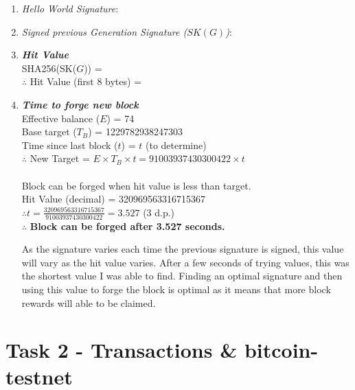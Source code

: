 \documentclass[11pt]{article}
\begin{document}
\begin{enumerate}
\item \textit{Hello World Signature}: \texttt{}

\item \textit{Signed previous Generation Signature ($SK(G)$)}: \texttt{}

\item \textbf{\textit{Hit Value}}\\
SHA256(SK($G$)) = \texttt{}\\
$\therefore$ Hit Value (first 8 bytes) = \textbf{\texttt{}}

\item \textbf{\textit{Time to forge new block}}\\
Effective balance ($E$) = 74\\
Base target ($T_B$) = 1229782938247303\\
Time since last block ($t$) = $t$ (to determine)\\
$\therefore$ New Target = $E\times T_B\times t=91003937430300422\times{t}$\\
\\
Block can be forged when hit value is less than target.\\
Hit Value (decimal) = 320969563316715367\\
$\therefore t=\frac{320969563316715367}{91003937430300422}=3.527$ (3 d.p.)\\
$\therefore$ \textbf{Block can be forged after 3.527 seconds.}\\
\begin{small}
As the signature varies each time the previous signature is signed, this value will vary as the hit value varies. After a few seconds of trying values, this was the shortest value I was able to find. Finding an optimal signature and then using this value to forge the block is optimal as it means that more block rewards will able to be claimed.
\end{small}


\end{enumerate}

\section*{Task 2 - Transactions \& bitcoin-testnet}
\end{document}
